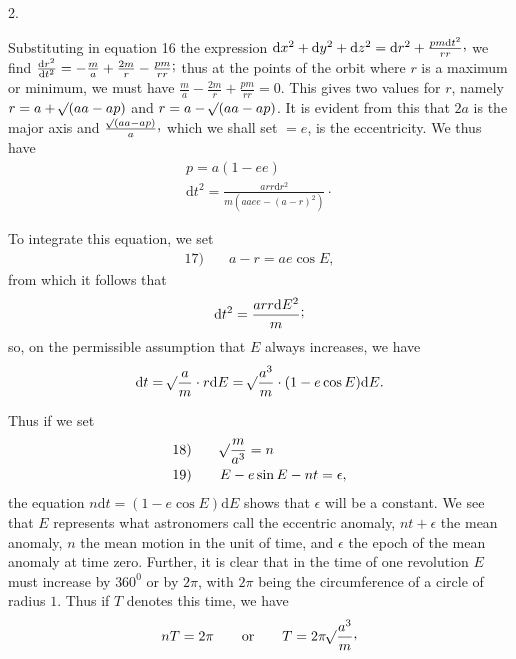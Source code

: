 \par{}\bigskip
{}
\begin{center}2.\end{center}
\noindent\hspace*{\parindent}Substituting in equation 16 the expression \(\mathrm{d}x^2+\mathrm{d}y^2+\mathrm{d}z^2=\mathrm{d}r^2+\frac{pm\mathrm{d}t^2}{rr}\mathpunct{\raisebox{.45ex}{,}}\) we find \(\frac{\mathrm{d}r^2}{\mathrm{d}t^2}=-\frac{m}{a}+\frac{2m}{r}-\frac{pm}{rr}\mathpunct{\raisebox{.45ex}{;}}\) thus at the points of the orbit where \(r\) is a maximum or minimum, we must have \(\frac{m}{a}-\frac{2m}{r}+\frac{pm}{rr}=0\). This gives two values for \(r\), namely \(r=a+\mathord{{}^{}\!\surd}(aa-ap)\) and \(r=a-\mathord{{}^{}\!\surd}(aa-ap)\). It is evident from this that \(2a\) is the major axis and \(\frac{\BareRoot{(aa-ap)}}{a}\mathpunct{\raisebox{.45ex}{,}}\) which we shall set \(=e\), is the eccentricity. We thus have
\[
\begin{gathered}
p=a(1-ee)\\[4pt]
\mathrm{d}t^2=\frac{arr\mathrm{d}r^2}{m(aaee-(a-r)^2)}\mathpunct{\cdot}
\end{gathered}
\]
\par To integrate this equation, we set
\[
\begin{array}{rl}17)\quad&a-r=ae\cos E,\end{array}
\]
from which it follows that
\[
\mathrm{d}t^2=\frac{arr\mathrm{d}E^2}{m}\mathpunct{\raisebox{.45ex}{;}}
\]
so, on the permissible assumption that \(E\) always increases, we have
\[
\mathrm{d}t=\mathord{{}^{}\!\surd}\frac{a}{m}\cdot r\mathrm{d}E=\mathord{{}^{}\!\surd}\frac{a^3}{m}\cdot(1-e\cos E)\mathrm{d}E.
\]
\par Thus if we set
\[
\begin{array}{rl}
18)\quad&\mathord{{}^{}\!\surd}\dfrac{m}{a^3}=n\\[6pt]
19)\quad&E-e\sin E-nt=\epsilon,
\end{array}
\]
the equation \(n\mathrm{d}t=(1-e\cos E)\mathrm{d}E\) shows that \(\epsilon\) will be a constant. We see that \(E\) represents what astronomers call the eccentric anomaly, \(nt+\epsilon\) the mean anomaly, \(n\) the mean motion in the unit of time, and \(\epsilon\) the epoch of the mean anomaly at time zero. Further, it is clear that in the time of one revolution \(E\) must increase by \(360^{0}\) or by \(2\pi\), with \(2\pi\) being the circumference of a circle of radius \(1\). Thus if \(T\) denotes this time, we have
\[
nT=2\pi\qquad\text{or}\qquad T=2\pi\BareRoot{\frac{a^3}{m}}\mathpunct{\raisebox{.45ex}{,}}
\]
